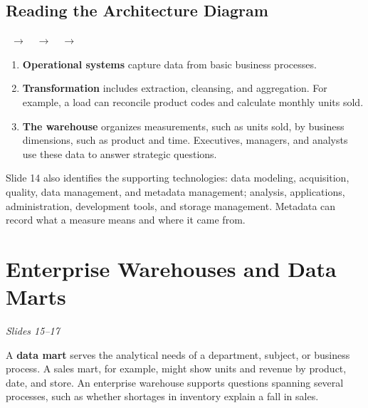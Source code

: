 \documentclass[12pt,a4paper]{article}
\newcommand{\slides}[1]{\textit{\small #1}\par}
\begin{document}
\subsection{Reading the Architecture Diagram}
\begin{center}\small
{}\ $\longrightarrow$\ \ $\longrightarrow$\ \ $\longrightarrow$\ 
\end{center}
\begin{enumerate}
\item \textbf{Operational systems} capture data from basic business processes.
\item \textbf{Transformation} includes extraction, cleansing, and aggregation. For example, a load can reconcile product codes and calculate monthly units sold.
\item \textbf{The warehouse} organizes measurements, such as units sold, by business dimensions, such as product and time. Executives, managers, and analysts use these data to answer strategic questions.
\end{enumerate}
Slide 14 also identifies the supporting technologies: data modeling, acquisition, quality, data management, and metadata management; analysis, applications, administration, development tools, and storage management. Metadata can record what a measure means and where it came from.

\newpage
\section{Enterprise Warehouses and Data Marts}
\slides{Slides 15--17}
A \textbf{data mart} serves the analytical needs of a department, subject, or business process. A sales mart, for example, might show units and revenue by product, date, and store. An enterprise warehouse supports questions spanning several processes, such as whether shortages in inventory explain a fall in sales.
\end{document}
